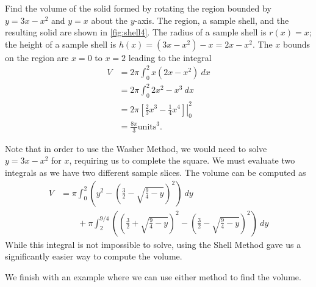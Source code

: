 \begin{example}\label{ex_shell4}
Find the volume of the solid formed by rotating the region bounded by $y=3x-x^2$ and $y=x$ about the $y$-axis.
\solution
The region, a sample shell, and the resulting solid are shown in \autoref{fig:shell4}. The radius of a sample shell is $r(x)=x$; the height of a sample shell is $h(x)=(3x-x^2)-x=2x-x^2$. The $x$ bounds on the region are $x=0$ to $x=2$ leading to the integral
\begin{align*}
V&=2\pi \int_0^2 x(2x-x^2) \ dx\\
&=2\pi \int_0^2 2x^2-x^3 \ dx\\
&=2\pi \left.\left[ \frac23 x^3-\frac14 x^4 \right] \right|_0^2\\
&=\frac{8\pi}{3} \text{units}^3.
\end{align*}

Note that in order to use the Washer Method, we would need to solve $y=3x-x^2$ for $x$, requiring us to complete the square. We must evaluate two integrals as we have two different sample slices. The volume can be computed as 
\begin{align*}
V&=\pi\int_0^2\left(y^2-\left(\frac32-\sqrt{\frac94 -y}\right)^2\right)\ dy \\
&\qquad+\pi\int_2^{9/4}\left(\left(\frac32+\sqrt{\frac94 -y}\right)^2
-\left(\frac32-\sqrt{\frac94 -y}\right)^2\right)\ dy
\end{align*}
While this integral is not impossible to solve, using the Shell Method gave us a significantly easier way to compute the volume.
\end{example}

We finish with an example where we can use either method to find the volume.

